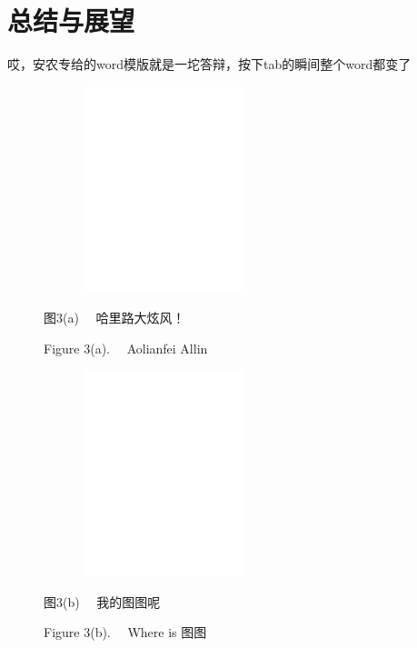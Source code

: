 \documentclass[UTF8,a4paper,12pt]{ctexart}
\begin{document}
	\section{\fontsize{16pt}{\baselineskip}\heiti 总结与展望}
	哎，安农专给的word模版就是一坨答辩，按下tab的瞬间整个word都变了
	
	\begin{figure}[h]
		\vspace{-0.1cm} 
		\begin{minipage}[t]{0.45\linewidth}
			\centering
			\includegraphics[height=6cm,width=7cm]{pic/fknumscom-eps-converted-to.pdf}
			
			\begin{center}
				\fontsize{11pt}{\baselineskip}\heiti 图3(a) \ \  哈里路大炫风！ \par Figure 3(a). \ \ Aolianfei Allin
			\end{center} 
		\end{minipage}
		\begin{minipage}[t]{0.45\linewidth}
			\centering
			\includegraphics[height=6cm,width=7cm]{pic/fknumstime-eps-converted-to.pdf}
			
			\begin{center}
				\fontsize{11pt}{\baselineskip}\heiti 图3(b)  \ \  我的图图呢  \par Figure 3(b). \ \ Where is 图图
			\end{center} 
		\end{minipage}
	\end{figure}
\end{document}
